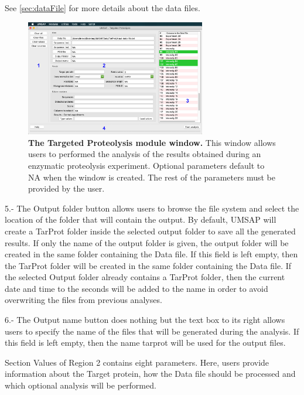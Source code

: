 See \autoref{sec:dataFile} for more details about the data files.

\begin{figure}[h]
	\centering
	\includegraphics[width=0.7\textwidth]{./IMAGES/MOD-TARPROT/tarprot-mod.jpg}
	\caption[The Targeted Proteolysis module window]{\textbf{The Targeted Proteolysis module window.} This window allows users to performed the analysis of the results obtained during an enzymatic proteolysis experiment. Optional parameters default to NA when the window is created. The rest of the parameters must be provided by the user.} 
	\label{fig:tarprotMainWindow}
	\vspace{-5pt} 	
\end{figure} 

\num{5}.- The Output folder\label{par:tarprotOutFolder} button allows users to browse the file system and select the location of the folder that will contain the output. By default, UMSAP will create a TarProt folder inside the selected output folder to save all the generated results. If only the name of the output folder is given, the output folder will be created in the same folder containing the Data file. If this field is left empty, then the TarProt folder will be created in the same folder containing the Data file. If the selected Output folder already contains a TarProt folder, then the current date and time to the seconds will be added to the name in order to avoid overwriting the files from previous analyses.

\num{6}.- The Output name button does nothing but the text box to its right allows users to specify the name of the files that will be generated during the analysis. If this field is left empty, then the name tarprot will be used for the output files. 

Section Values of Region \num{2} contains eight parameters. Here, users provide information about the Target protein, how the Data file should be processed and which optional analysis will be performed.

